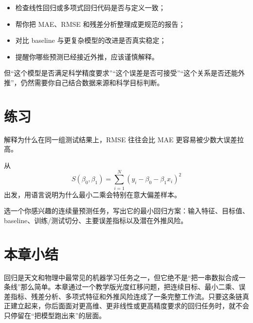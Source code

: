 \begin{itemize}
    \item 检查线性回归或多项式回归代码是否与定义一致；
    \item 帮你把 MAE、RMSE 和残差分析整理成更规范的报告；
    \item 对比 baseline 与更复杂模型的改进是否真实稳定；
    \item 提醒你哪些预测已经接近外推，应该谨慎解释。
\end{itemize}

但“这个模型是否满足科学精度要求”“这个误差是否可接受”“这个关系是否还能外推”，仍然需要你自己结合数据来源和科学目标判断。

\section{练习}

\begin{exercisebox}[基础练习]
解释为什么在同一组测试结果上，RMSE 往往会比 MAE 更容易被少数大误差拉高。
\end{exercisebox}

\begin{exercisebox}[进阶练习]
从
\[
S(\beta_0, \beta_1) = \sum_{i=1}^{N}
\left(y_i - \beta_0 - \beta_1 x_i\right)^2
\]
出发，用语言说明为什么最小二乘会特别在意大偏差样本。
\end{exercisebox}

\begin{exercisebox}[开放练习]
选一个你感兴趣的连续量预测任务，写出它的最小回归方案：输入特征、目标值、baseline、训练/测试切分、主要误差指标以及潜在外推风险。
\end{exercisebox}

\section{本章小结}

回归是天文和物理中最常见的机器学习任务之一，但它绝不是“把一串数拟合成一条线”那么简单。本章通过一个教学版光度红移问题，把连续目标、最小二乘、误差指标、残差分析、多项式特征和外推风险连成了一条完整工作流。只要这条链真正建立起来，你后面面对更高维、更非线性或更高精度要求的回归任务时，就不会只停留在“把模型跑出来”的层面。
